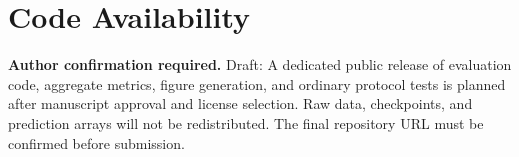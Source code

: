 \documentclass[aip,reprint,floatfix,amsmath,amssymb]{revtex4-2}
\begin{document}
\section*{Code Availability}
\textbf{Author confirmation required.} Draft: A dedicated public release of evaluation code, aggregate metrics, figure generation, and ordinary protocol tests is planned after manuscript approval and license selection. Raw data, checkpoints, and prediction arrays will not be redistributed. The final repository URL must be confirmed before submission.


\end{document}
